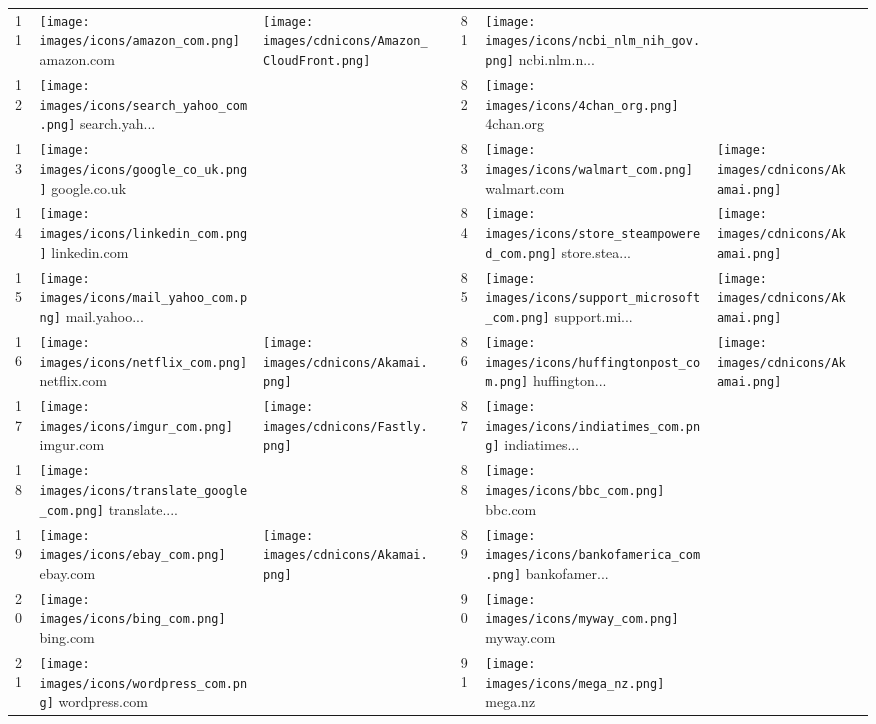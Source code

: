 \begin{table}[tbp]
\begin{tabular}{|llll|llll|}
11 & \texttt{[image: images/icons/amazon\_com.png]} amazon.com & \texttt{[image: images/cdnicons/Amazon\_CloudFront.png]} & & 81 & \texttt{[image: images/icons/ncbi\_nlm\_nih\_gov.png]} ncbi.nlm.n... & & \\
12 & \texttt{[image: images/icons/search\_yahoo\_com.png]} search.yah... & & & 82 & \texttt{[image: images/icons/4chan\_org.png]} 4chan.org & & \\
13 & \texttt{[image: images/icons/google\_co\_uk.png]} google.co.uk & & & 83 & \texttt{[image: images/icons/walmart\_com.png]} walmart.com & \texttt{[image: images/cdnicons/Akamai.png]} & \\
14 & \texttt{[image: images/icons/linkedin\_com.png]} linkedin.com & & & 84 & \texttt{[image: images/icons/store\_steampowered\_com.png]} store.stea... & \texttt{[image: images/cdnicons/Akamai.png]} & \\
15 & \texttt{[image: images/icons/mail\_yahoo\_com.png]} mail.yahoo... & & & 85 & \texttt{[image: images/icons/support\_microsoft\_com.png]} support.mi... & \texttt{[image: images/cdnicons/Akamai.png]} & \\
16 & \texttt{[image: images/icons/netflix\_com.png]} netflix.com & \texttt{[image: images/cdnicons/Akamai.png]} & & 86 & \texttt{[image: images/icons/huffingtonpost\_com.png]} huffington... & \texttt{[image: images/cdnicons/Akamai.png]} & \\
17 & \texttt{[image: images/icons/imgur\_com.png]} imgur.com & \texttt{[image: images/cdnicons/Fastly.png]} & & 87 & \texttt{[image: images/icons/indiatimes\_com.png]} indiatimes... & & \\
18 & \texttt{[image: images/icons/translate\_google\_com.png]} translate.... & & & 88 & \texttt{[image: images/icons/bbc\_com.png]} bbc.com & & \\
19 & \texttt{[image: images/icons/ebay\_com.png]} ebay.com & \texttt{[image: images/cdnicons/Akamai.png]} & & 89 & \texttt{[image: images/icons/bankofamerica\_com.png]} bankofamer... & & \\
20 & \texttt{[image: images/icons/bing\_com.png]} bing.com & & & 90 & \texttt{[image: images/icons/myway\_com.png]} myway.com & & \\
21 & \texttt{[image: images/icons/wordpress\_com.png]} wordpress.com & & & 91 & \texttt{[image: images/icons/mega\_nz.png]} mega.nz & & \\

\end{tabular}
\end{table}
